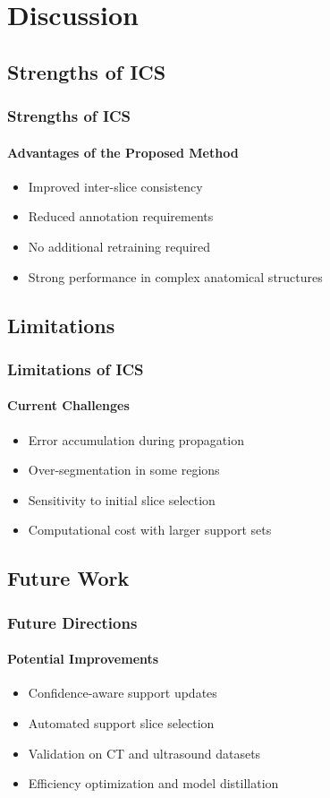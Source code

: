 \documentclass[nometaot,lecture,amberg,autotoc,toc=twocolumn,indicatelastpageofframe,footlinebox]{OTHAWbeamer}
\begin{document}
\section{Discussion}

\subsection{Strengths of ICS}

\begin{frame}
    \frametitle{Strengths of ICS}
    \framesubtitle{Advantages of the Proposed Method}

    \begin{itemize}
        \item Improved inter-slice consistency
        \item Reduced annotation requirements
        \item No additional retraining required
        \item Strong performance in complex anatomical structures
    \end{itemize}

\end{frame}

\subsection{Limitations}

\begin{frame}
    \frametitle{Limitations of ICS}
    \framesubtitle{Current Challenges}

    \begin{itemize}
        \item Error accumulation during propagation
        \item Over-segmentation in some regions
        \item Sensitivity to initial slice selection
        \item Computational cost with larger support sets
    \end{itemize}

\end{frame}

\subsection{Future Work}

\begin{frame}
    \frametitle{Future Directions}
    \framesubtitle{Potential Improvements}

    \begin{itemize}
        \item Confidence-aware support updates
        \item Automated support slice selection
        \item Validation on CT and ultrasound datasets
        \item Efficiency optimization and model distillation
    \end{itemize}

\end{frame}
\end{document}
